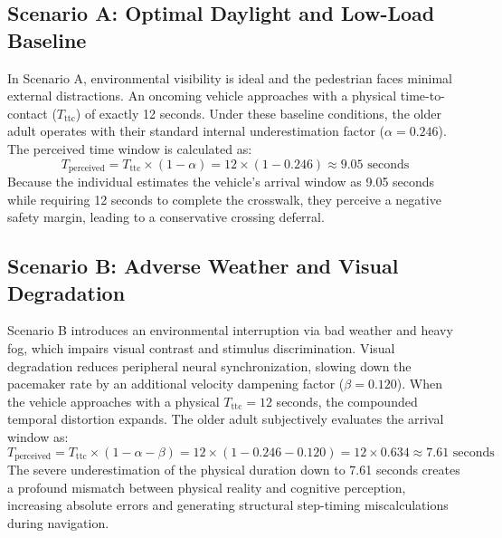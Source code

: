 \documentclass{custom_report}
\begin{document}
\subsection{Scenario A: Optimal Daylight and Low-Load Baseline}
In Scenario A, environmental visibility is ideal and the pedestrian faces minimal external distractions. An oncoming vehicle approaches with a physical time-to-contact ($T_{\text{ttc}}$) of exactly 12 seconds. Under these baseline conditions, the older adult operates with their standard internal underestimation factor ($\alpha = 0.246$). The perceived time window is calculated as:
\begin{equation}
    T_{\text{perceived}} = T_{\text{ttc}} \times (1 - \alpha) = 12 \times (1 - 0.246) \approx 9.05\text{ seconds}
\end{equation}
Because the individual estimates the vehicle's arrival window as 9.05 seconds while requiring 12 seconds to complete the crosswalk, they perceive a negative safety margin, leading to a conservative crossing deferral.

\subsection{Scenario B: Adverse Weather and Visual Degradation}
Scenario B introduces an environmental interruption via bad weather and heavy fog, which impairs visual contrast and stimulus discrimination. Visual degradation reduces peripheral neural synchronization, slowing down the pacemaker rate by an additional velocity dampening factor ($\beta = 0.120$). When the vehicle approaches with a physical $T_{\text{ttc}} = 12$ seconds, the compounded temporal distortion expands. The older adult subjectively evaluates the arrival window as:
\begin{equation}
    T_{\text{perceived}} = T_{\text{ttc}} \times (1 - \alpha - \beta) = 12 \times (1 - 0.246 - 0.120) = 12 \times 0.634 \approx 7.61\text{ seconds}
\end{equation}
The severe underestimation of the physical duration down to 7.61 seconds creates a profound mismatch between physical reality and cognitive perception, increasing absolute errors and generating structural step-timing miscalculations during navigation.
\end{document}
